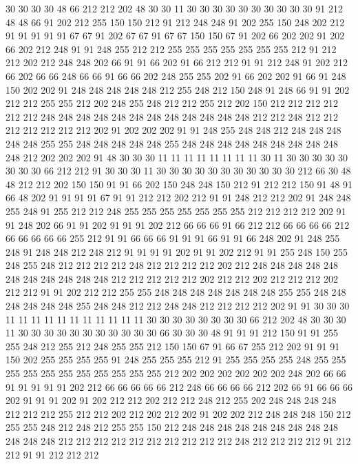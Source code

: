 30 30 30 30 48 66 212 212 202 48 30 30 11 30 30 30 30 30 30 30
30 30 30 91 212 48 48 66 91 202 212 255 150 150 212 91 212 248 248 91
202 255 150 248 202 212 91 91 91 91 91 67 67 91 202 67 67 91 67 67
150 150 67 91 202 66 202 202 91 202 66 202 212 248 91 91 248 255 212 212
255 255 255 255 255 255 255 212 91 212 212 202 212 248 248 202 66 91 91 66
202 91 66 212 212 91 91 212 248 91 202 212 66 202 66 66 248 66 66 91
66 66 202 248 255 255 202 91 66 202 202 91 66 91 248 150 202 202 91 248
248 248 248 248 212 255 248 212 150 248 91 248 66 91 91 202 212 212 255 255
212 202 248 255 248 212 212 255 212 202 150 212 212 212 212 212 212 248 248 248
248 248 248 248 248 248 248 248 248 212 212 248 212 212 212 212 212 212 212 202
91 202 202 202 91 91 248 255 248 248 212 248 248 248 248 248 255 255 248 248
248 248 248 255 248 248 248 248 248 248 248 248 248 248 212 202 202 202 91 48
30 30 30 11 11 11 11 11 11 11 11 30 11 30 30 30 30 30 30 30
30 66 212 212 91 30 30 30 11 30 30 30 30 30 30 30 30 30 30 30
212 66 30 48 48 212 212 202 150 150 91 91 66 202 150 248 248 150 212 91
212 212 150 91 48 91 66 48 202 91 91 91 91 67 91 91 212 212 202 212
91 91 248 212 212 202 91 248 248 255 248 91 255 212 212 248 255 255 255 255
255 255 255 212 212 212 212 202 91 91 248 202 66 91 91 202 91 91 91 202
212 66 66 66 91 66 212 212 66 66 66 66 212 66 66 66 66 66 255 212
91 91 66 66 66 91 91 91 66 91 91 66 248 202 91 248 255 248 91 248
248 212 248 212 91 91 91 91 202 91 91 202 212 91 91 255 248 150 255 248
255 248 212 212 212 212 248 212 212 212 212 202 212 248 248 248 248 248 248 248
248 248 248 248 212 212 212 212 212 202 212 212 202 212 212 212 202 212 212 91
91 202 212 212 255 255 248 248 248 248 248 248 248 255 255 248 248 248 248 248
248 255 248 248 212 212 248 248 212 212 212 212 202 91 91 30 30 30 11 11
11 11 11 11 11 11 11 11 11 30 30 30 30 30 30 30 30 66 212 202
48 30 30 30 11 30 30 30 30 30 30 30 30 30 30 30 66 30 30 30
48 91 91 91 212 150 91 91 255 255 248 212 255 212 248 255 255 212 150 150
67 91 66 67 255 212 202 91 91 91 150 202 255 255 255 255 91 248 255 255
255 212 91 255 255 255 255 248 255 255 255 255 255 255 255 255 255 255 255 212
202 202 202 202 202 202 248 202 66 66 91 91 91 91 91 202 212 66 66 66
66 66 212 248 66 66 66 66 212 202 66 91 66 66 66 202 91 91 91 202
91 202 212 212 202 212 212 248 212 255 202 248 248 248 248 212 212 212 255 212
212 202 212 202 212 202 91 202 202 212 248 248 248 150 212 255 255 248 212 248
212 255 255 150 212 248 248 248 248 248 248 248 248 248 248 248 248 212 212 212
212 212 212 212 212 212 212 248 212 212 212 212 91 212 212 91 91 212 212 212

